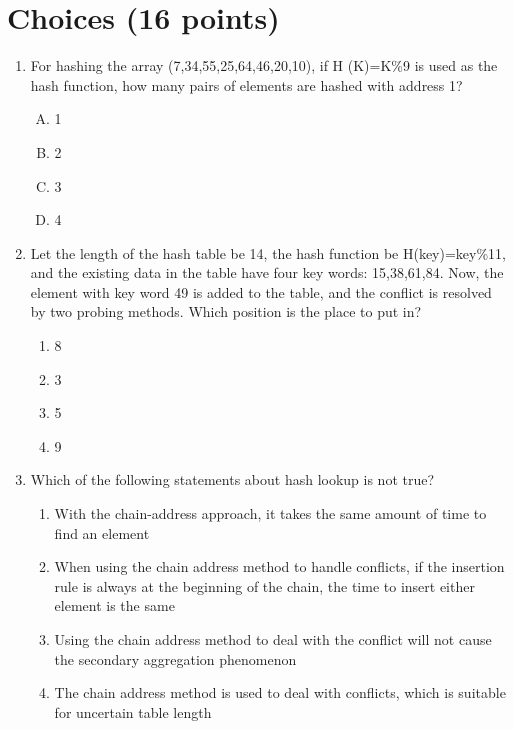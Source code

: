 \documentclass[11pt]{exam}
\begin{document}
\section{Choices (16 points)}
\begin{enumerate}
    \item For hashing the array (7,34,55,25,64,46,20,10), if H (K)=K\%9 is used as the hash function,
          how many pairs of elements are hashed with address 1?
          \begin{enumerate}[A.]
              \item 1
              \item 2
              \item 3
              \item 4
          \end{enumerate}
          \begin{solution}
          \end{solution}
    \item Let the length of the hash table be 14, the hash function be H(key)=key\%11, and the existing data in the table have four key words: 15,38,61,84. Now, the element with key word 49 is added to the table, and the conflict is resolved by two probing methods.
          Which position is the place to put in?
          \begin{enumerate}
              \item 8
              \item 3
              \item 5
              \item 9
          \end{enumerate}
          \begin{solution}
          \end{solution}
    \item Which of the following statements about hash lookup is not true?
          \begin{enumerate}
              \item With the chain-address approach, it takes the same amount of time to find an element
              \item When using the chain address method to handle conflicts, if the insertion rule is always at the beginning of the chain, the time to insert either element is the same
              \item Using the chain address method to deal with the conflict will not cause the secondary aggregation phenomenon
              \item The chain address method is used to deal with conflicts, which is suitable for uncertain table length


\end{enumerate}
\end{enumerate}
\end{document}
